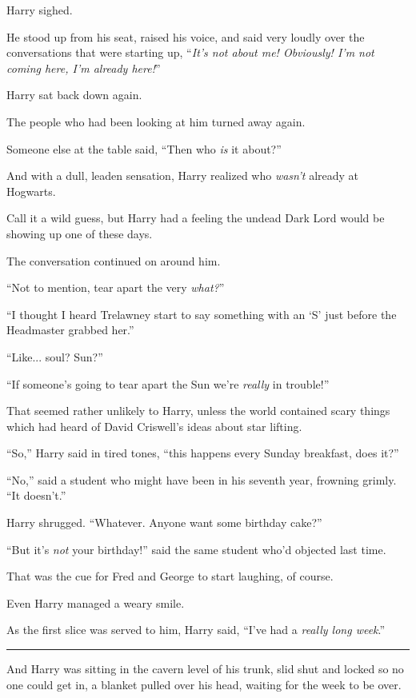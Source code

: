 Harry sighed.

He stood up from his seat, raised his voice, and said very loudly over the conversations that were starting up, ``\emph{It's not about me! Obviously! I'm not coming here, I'm already here!}''

Harry sat back down again.

The people who had been looking at him turned away again.

Someone else at the table said, ``Then who \emph{is} it about?''

And with a dull, leaden sensation, Harry realized who \emph{wasn't} already at Hogwarts.

Call it a wild guess, but Harry had a feeling the undead Dark Lord would be showing up one of these days.

The conversation continued on around him.

``Not to mention, tear apart the very \emph{what?}''

``I thought I heard Trelawney start to say something with an `S' just before the Headmaster grabbed her.''

``Like... soul? Sun?''

``If someone's going to tear apart the Sun we're \emph{really} in trouble!''

That seemed rather unlikely to Harry, unless the world contained scary things which had heard of David Criswell's ideas about star lifting.

``So,'' Harry said in tired tones, ``this happens every Sunday breakfast, does it?''

``No,'' said a student who might have been in his seventh year, frowning grimly. ``It doesn't.''

Harry shrugged. ``Whatever. Anyone want some birthday cake?''

``But it's \emph{not} your birthday!'' said the same student who'd objected last time.

That was the cue for Fred and George to start laughing, of course.

Even Harry managed a weary smile.

As the first slice was served to him, Harry said, ``I've had a \emph{really long week}.''

\begin{center}\rule{3in}{0.4pt}\end{center}

And Harry was sitting in the cavern level of his trunk, slid shut and locked so no one could get in, a blanket pulled over his head, waiting for the week to be over.

